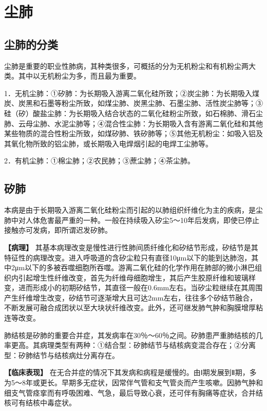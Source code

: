\section{尘肺}

\subsection{尘肺的分类}

尘肺是重要的职业性肺病，其种类很多，可概括的分为无机粉尘和有机粉尘两大类。其中以无机粉尘为多，而且最为重要。

1．无机尘肺：①矽肺：为长期吸入游离二氧化硅所致；②炭尘肺：为长期吸入煤炭、炭黑和石墨等粉尘所致，如煤尘肺、炭黑尘肺、石墨尘肺、活性炭尘肺等；③硅（矽）酸盐尘肺：为长期吸入结合状态的二氧化硅粉尘所致，如石棉肺、滑石尘肺、云母尘肺、水泥尘肺等；④混合性尘肺：为长期吸入含有游离二氧化硅和其他某些物质的混合性粉尘所致，如煤矽肺、铁矽肺等；⑤其他无机粉尘：如吸入铝及其氧化物所致的铝尘肺，或长期吸入电焊烟引起的电焊工尘肺等。

2．有机尘肺：①棉尘肺；②农民肺；③蔗尘肺；④茶尘肺。

\subsection{矽肺}

本病是由于长期吸入游离二氧化硅粉尘而引起的以肺组织纤维化为主的疾病，是尘肺中对人体危害最严重的一种。一般在持续吸入矽尘5～10年后发病，即使已停止接触亦可发病，即所谓迟发矽肺。

\textbf{【病理】}
其基本病理改变是慢性进行性肺间质纤维化和矽结节形成，矽结节是其特征性的病理改变。进入呼吸道的含矽尘粒只有直径10μm以下的能到达肺泡，其中2μm以下的多被吞噬细胞所吞噬。游离二氧化硅的化学作用在肺部的微小淋巴组织内引起增生性纤维改变，首先为纤维母细胞增生，其后产生胶原纤维和玻璃样变，进而形成小的初期矽结节，其直径一般在0.6mm左右。当矽尘粒继续在其周围产生纤维增生改变，矽结节可逐渐增大且可达2mm左右，往往多个矽结节融合，不断发展可融合成团状以至大块状纤维改变。此外，还可继发肺气肿和胸膜增厚粘连等改变。

肺结核是矽肺的重要合并症，其发病率在30％～60％之间。矽肺患严重肺结核的几率更高。其病理类型有两种：①结合型：矽肺结节与结核病变混合存在；②分离型：矽肺结节与结核病灶分离存在。

\textbf{【临床表现】}
在无合并症的情况下其发病和病程是缓慢的。由Ⅰ期发展到Ⅱ期，多为5～8年或更长。早期多无症状，因常伴气管和支气管炎而产生咳嗽。因肺气肿和细支气管痉挛而有呼吸困难、气急，最后导致心衰，还可伴有胸痛等症状，合并结核可有结核中毒症状。

